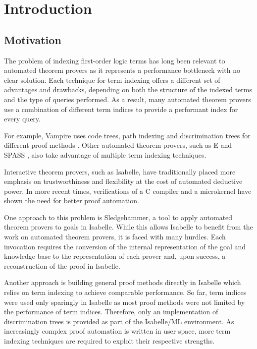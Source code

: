 \chapter{Introduction}\label{chapter:introduction}
\section{Motivation}
The problem of indexing first-order logic terms has long been relevant to automated theorem provers as it represents a performance bottleneck with no clear solution. Each technique for term indexing offers a different set of advantages and drawbacks, depending on both the structure of the indexed terms and the type of queries performed. As a result, many automated theorem provers use a combination of different term indices to provide a performant index for every query.

For example, Vampire uses code trees, path indexing and discrimination trees for different proof methods \cite{riazanov_vampire_1999}. Other automated theorem provers, such as E \cite{schulz_system_2004} and SPASS \cite{weidenbach_spass_2009}, also take advantage of multiple term indexing techniques.

Interactive theorem provers, such as Isabelle, have traditionally placed more emphasis on trustworthiness and flexibility at the cost of automated deductive power. In more recent times, verifications of a C compiler \cite{klein_sel4_2009} and a microkernel \cite{leroy_formally_2009} have shown the need for better proof automation.

One approach to this problem is Sledgehammer, a tool to apply automated theorem provers to goals in Isabelle. While this allows Isabelle to benefit from the work on automated theorem provers, it is faced with many hurdles. Each invocation requires the conversion of the internal representation of the goal and knowledge base to the representation of each prover and, upon success, a reconstruction of the proof in Isabelle. \cite{bohme_sledgehammer_2010,blanchette_more_2012}

Another approach is building general proof methods directly in Isabelle which relies on term indexing to achieve comparable performance. So far, term indices were used only sparingly in Isabelle as most proof methods were not limited by the performance of term indices. Therefore, only an implementation of discrimination trees is provided as part of the Isabelle/ML environment. As increasingly complex proof automation is written in user space, more term indexing techniques are required to exploit their respective strengths.

